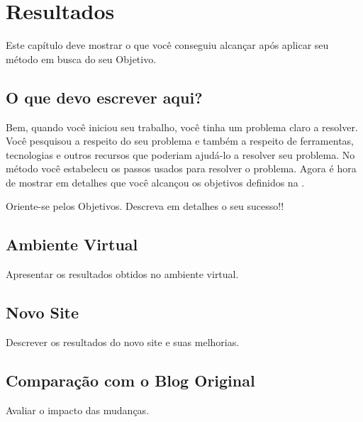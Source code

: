 \chapter{Resultados}
\label{Resultados}

Este capítulo deve mostrar o que você conseguiu alcançar após aplicar seu método em busca do seu Objetivo.

\section{O que devo escrever aqui?}
Bem, quando você iniciou seu trabalho, você tinha um problema claro a resolver.
Você pesquisou a respeito do seu problema e também a respeito de ferramentas, tecnologias e outros recursos que poderiam ajudá-lo a resolver seu problema. No método você estabelecu os passos usados para resolver o problema. Agora é hora de mostrar em detalhes que você alcançou os objetivos definidos na .

Oriente-se pelos Objetivos. Descreva em detalhes o seu sucesso!!


\section{Ambiente Virtual}
Apresentar os resultados obtidos no ambiente virtual.

\section{Novo Site}
Descrever os resultados do novo site e suas melhorias.

\section{Comparação com o Blog Original}
Avaliar o impacto das mudanças.

